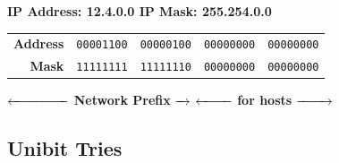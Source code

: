 \documentclass{article}
\begin{document}
    \begin{center}
    \textbf{IP Address: 12.4.0.0 \quad IP Mask: 255.254.0.0}
    
    \smallskip
    \begin{tabular}{r|c|c|c|c|}
    \textbf{Address} & \texttt{00001100} & \texttt{00000100} & \texttt{00000000} & \texttt{00000000} \\
    \textbf{Mask}    & \texttt{11111111} & \texttt{11111110} & \texttt{00000000} & \texttt{00000000} \\
    \end{tabular}
    
    \smallskip
    $\xleftarrow{\hspace{1.5cm}}$ \textbf{Network Prefix} $\xrightarrow{\hspace{0.2cm}}$
    $\xleftarrow{\hspace{0.8cm}}$ \textbf{for hosts} $\xrightarrow{\hspace{0.8cm}}$
    
    \smallskip
    \end{center}

    \subsection{Unibit Tries}
\end{document}
